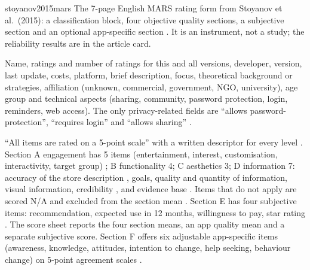 \begin{papercard}{stoyanov2015mars}
 The 7-page English MARS rating form from Stoyanov et al.\ (2015): a classification block, four objective quality sections, a subjective section and an optional app-specific section . It is an instrument, not a study; the reliability results are in the article card.

 Name, ratings and number of ratings for this and all versions, developer, version, last update, costs, platform, brief description, focus, theoretical background or strategies, affiliation (unknown, commercial, government, NGO, university), age group and technical aspects (sharing, community, password protection, login, reminders, web access). The only privacy-related fields are ``allows password-protection'', ``requires login'' and ``allows sharing'' .

 ``All items are rated on a 5-point scale'' with a written descriptor for every level . Section A engagement has 5 items (entertainment, interest, customisation, interactivity, target group) ; B functionality 4; C aesthetics 3; D information 7: accuracy of the store description , goals, quality and quantity of information, visual information, credibility , and evidence base . Items that do not apply are scored N/A and excluded from the section mean . Section E has four subjective items: recommendation, expected use in 12 months, willingness to pay, star rating . The score sheet reports the four section means, an app quality mean and a separate subjective score. Section F offers six adjustable app-specific items (awareness, knowledge, attitudes, intention to change, help seeking, behaviour change) on 5-point agreement scales .


\end{papercard}
